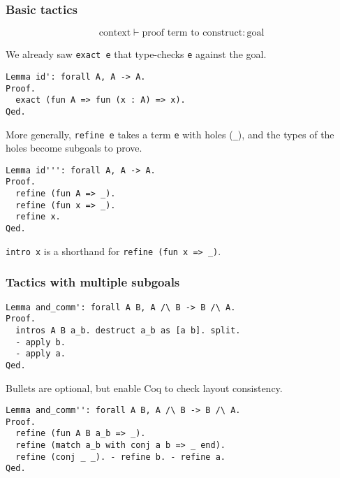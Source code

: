 \documentclass{beamer}
\begin{document}
\begin{frame}[fragile]
\frametitle{Basic tactics}

\[
\text{context} \vdash \text{proof term to construct} : \text{goal}
\]

\vfill

We already saw \texttt{exact e} that type-checks \texttt{e} against the goal.
\begin{verbatim}
Lemma id': forall A, A -> A.
Proof.
  exact (fun A => fun (x : A) => x).
Qed.
\end{verbatim}

\vfill

More generally, \texttt{refine e} takes a term \texttt{e} with holes (\texttt{_}), and the types of the holes become subgoals to prove.

\begin{verbatim}
Lemma id''': forall A, A -> A.
Proof.
  refine (fun A => _).
  refine (fun x => _).
  refine x.
Qed.
\end{verbatim}

\texttt{intro x} is a shorthand for \texttt{refine (fun x => _)}.

\end{frame}
\begin{frame}[fragile]
\frametitle{Tactics with multiple subgoals}

{
\footnotesize
\begin{verbatim}
Lemma and_comm': forall A B, A /\ B -> B /\ A.
Proof.
  intros A B a_b. destruct a_b as [a b]. split.
  - apply b.
  - apply a.
Qed.
\end{verbatim}
}
{\footnotesize
Bullets are optional, but enable Coq to check layout consistency.
}
{
\footnotesize
\begin{mathpar}
\end{mathpar}
}

{
\footnotesize
\begin{verbatim}
Lemma and_comm'': forall A B, A /\ B -> B /\ A.
Proof.
  refine (fun A B a_b => _).
  refine (match a_b with conj a b => _ end).
  refine (conj _ _). - refine b. - refine a.
Qed.
\end{verbatim}
}
\end{frame}
\end{document}
